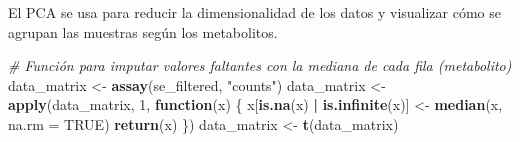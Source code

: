 \documentclass[
]{article}
\newenvironment{Shaded}{\begin{snugshade}}{\end{snugshade}}
\newcommand{\AttributeTok}[1]{\textcolor[rgb]{0.13,0.29,0.53}{#1}}
\newcommand{\CommentTok}[1]{\textcolor[rgb]{0.56,0.35,0.01}{\textit{#1}}}
\newcommand{\ConstantTok}[1]{\textcolor[rgb]{0.56,0.35,0.01}{#1}}
\newcommand{\ControlFlowTok}[1]{\textcolor[rgb]{0.13,0.29,0.53}{\textbf{#1}}}
\newcommand{\DecValTok}[1]{\textcolor[rgb]{0.00,0.00,0.81}{#1}}
\newcommand{\FunctionTok}[1]{\textcolor[rgb]{0.13,0.29,0.53}{\textbf{#1}}}
\newcommand{\NormalTok}[1]{#1}
\newcommand{\OtherTok}[1]{\textcolor[rgb]{0.56,0.35,0.01}{#1}}
\newcommand{\SpecialCharTok}[1]{\textcolor[rgb]{0.81,0.36,0.00}{\textbf{#1}}}
\newcommand{\StringTok}[1]{\textcolor[rgb]{0.31,0.60,0.02}{#1}}
\begin{document}
El PCA se usa para reducir la dimensionalidad de los datos y visualizar
cómo se agrupan las muestras según los metabolitos.

\begin{Shaded}
\begin{Highlighting}[]
\CommentTok{\# Función para imputar valores faltantes con la mediana de cada fila (metabolito)}
\NormalTok{data\_matrix }\OtherTok{\textless{}{-}} \FunctionTok{assay}\NormalTok{(se\_filtered, }\StringTok{"counts"}\NormalTok{)}
\NormalTok{data\_matrix }\OtherTok{\textless{}{-}} \FunctionTok{apply}\NormalTok{(data\_matrix, }\DecValTok{1}\NormalTok{, }\ControlFlowTok{function}\NormalTok{(x) \{}
\NormalTok{  x[}\FunctionTok{is.na}\NormalTok{(x) }\SpecialCharTok{|} \FunctionTok{is.infinite}\NormalTok{(x)] }\OtherTok{\textless{}{-}} \FunctionTok{median}\NormalTok{(x, }\AttributeTok{na.rm =} \ConstantTok{TRUE}\NormalTok{)}
  \FunctionTok{return}\NormalTok{(x)}
\NormalTok{\})}
\NormalTok{data\_matrix }\OtherTok{\textless{}{-}} \FunctionTok{t}\NormalTok{(data\_matrix) }
\end{Highlighting}
\end{Shaded}
\end{document}
